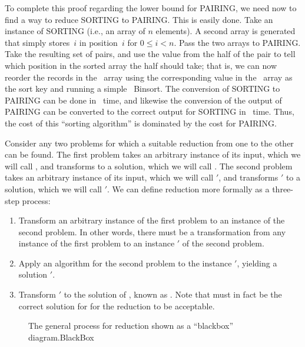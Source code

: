To complete this proof regarding the lower bound for PAIRING, we
need now to find a way to reduce SORTING to PAIRING.
This is easily done.
Take an instance of SORTING (i.e., an array  of \(n\) elements).
A second array  is generated that simply stores~\(i\) in
position~\(i\) for \(0 \leq i < n\).
Pass the two arrays to PAIRING.
Take the resulting set of pairs, and use the value from the 
half of the pair to tell which position in the sorted array the
 half should take; that is, we can now reorder the records in
the ~array using the corresponding value in the ~array
as the sort key and running a simple
\Thetan~Binsort.
The conversion of SORTING to PAIRING can be done in \On\ time,
and likewise the conversion of the output of PAIRING can be
converted to the correct output for SORTING in \On\ time.
Thus, the cost of this ``sorting algorithm'' is dominated by the cost
for PAIRING.

Consider any two problems for which a suitable reduction from one to
the other can be found.
The first problem takes an arbitrary instance of its input, which
we will call , and transforms  to a solution, which we
will call .
The second problem takes an arbitrary instance of its input, which
we will call \('\), and transforms \('\) to a solution,
which we will call \('\).
We can define reduction more formally as a three-step process:

\begin{enumerate}

\item
Transform an arbitrary instance of the first problem to an
instance of the second problem.
In other words, there must be a transformation from any instance
 of the first problem to an instance \('\) of the
second problem.

\item
Apply an algorithm for the second problem to the instance
\('\), yielding a solution \('\).

\item
Transform \('\) to the solution of
, known as .
Note that  must in fact be the correct solution for 
for the reduction to be acceptable.
\end{enumerate}

\begin{figure}

{The general process for reduction shown as a ``blackbox''
diagram.}{BlackBox}
\end{figure}

